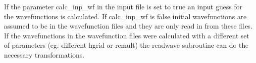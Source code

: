 \documentclass[12pt]{article}
\begin{document}
If the parameter { \color{red} calc\_inp\_wf } in the input file is set to true an 
input guess for the wavefunctions is calculated.
If  calc\_inp\_wf is false initial wavefunctions are assumed to be in the 
wavefunction files and they are only read in from these files. If the wavefunctions 
in the wavefunction files were calculated with a different set of parameters (eg. 
different hgrid or rcmult) the readwave subroutine can do the necessary 
transformations. 
\end{document}
